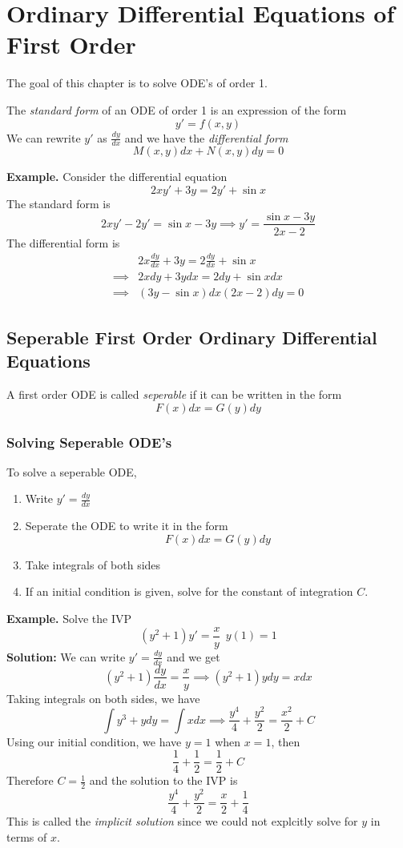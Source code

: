 \documentclass[openany]{report}
\begin{document}
\chapter{Ordinary Differential Equations of First Order}
The goal of this chapter is to solve ODE's of order 1. 
\begin{definition}
    The \emph{standard form} of an ODE of order 1 is an expression of the form 
    \[y' = f(x,y)\]
    We can rewrite $y'$ as $\frac{dy}{dx}$ and we have the \emph{differential form} 
    \[M(x,y)dx + N(x,y)dy = 0\]
\end{definition}
\noindent
\textbf{Example.} Consider the differential equation 
\[2xy' + 3y = 2y' + \sin x\]
The standard form is
\[2xy ' - 2y' = \sin x - 3y \implies y' = \frac{\sin x - 3y}{2x-2}\]
The differential form is 
\begin{align*}
    &2x\frac{dy}{dx} + 3y = 2\frac{dy}{dx} + \sin x   \\
    \implies&2xdy + 3ydx = 2dy + \sin x dx\\
    \implies& (3y - \sin x)dx (2x-2)dy = 0
\end{align*}
\section{Seperable First Order Ordinary Differential Equations}

\begin{definition}
    A first order ODE is called \emph{seperable} if it can be written in the form
    \[F(x)dx = G(y)dy\]
\end{definition}
\subsection{Solving Seperable ODE's} 
To solve a seperable ODE,
\begin{enumerate}
    \item Write $y' = \frac{dy}{dx}$
    \item Seperate the ODE to write it in the form 
    \[F(x)dx = G(y)dy\]
    \item Take integrals of both sides
    \item If an initial condition is given, solve for the constant of integration $C$. 
\end{enumerate}
\textbf{Example.} Solve the IVP 
\[(y^2 + 1)y' = \frac{x}{y} \ \ y(1) = 1\]
\textbf{Solution:} We can write $y' = \frac{dy}{dx}$ and we get 
    \[(y^2 + 1)\frac{dy}{dx} = \frac{x}{y} \implies (y^2 + 1)ydy = xdx\]
    Taking integrals on both sides, we have 
    \[\int y^3 + ydy = \int xdx \implies \frac{y^4}{4} + \frac{y^2}{2} = \frac{x^2}{2} + C\]
    Using our initial condition, we have $y = 1$ when $x =1$, then 
    \[\frac{1}{4} + \frac{1}{2} = \frac{1}{2} + C\]
    Therefore $C = \frac{1}{2}$ and the solution to the IVP is
    \[\frac{y^4}{4} + \frac{y^2}{2} = \frac{x}{2} + \frac{1}{4}\]
    This is called the \emph{implicit solution} since we could not explcitly solve for $y$ in terms of $x$. \\[2ex]
\end{document}
